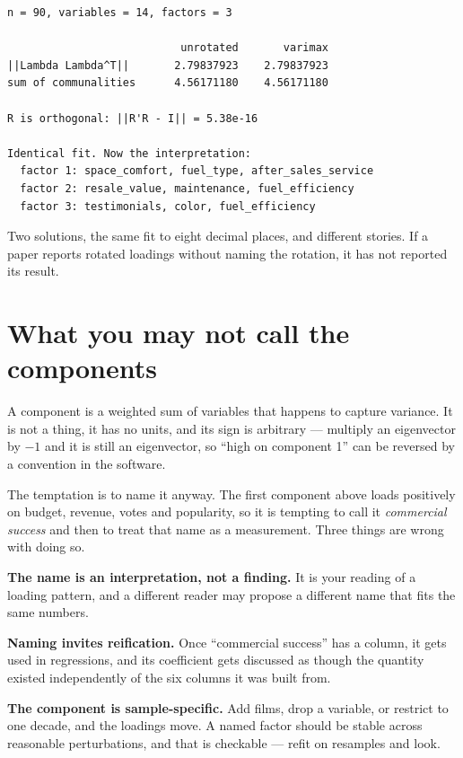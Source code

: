\documentclass[
  letterpaper,
  10pt,
  twoside,
  openright,
  numbers=noenddot,
  chapterprefix=true]{scrbook}
\begin{document}
\begin{verbatim}
n = 90, variables = 14, factors = 3

                           unrotated       varimax
||Lambda Lambda^T||       2.79837923    2.79837923
sum of communalities      4.56171180    4.56171180

R is orthogonal: ||R'R - I|| = 5.38e-16

Identical fit. Now the interpretation:
  factor 1: space_comfort, fuel_type, after_sales_service
  factor 2: resale_value, maintenance, fuel_efficiency
  factor 3: testimonials, color, fuel_efficiency
\end{verbatim}

Two solutions, the same fit to eight decimal places, and different
stories. If a paper reports rotated loadings without naming the
rotation, it has not reported its result.

\section{What you may not call the
components}\label{what-you-may-not-call-the-components}

A component is a weighted sum of variables that happens to capture
variance. It is not a thing, it has no units, and its sign is arbitrary
--- multiply an eigenvector by \(-1\) and it is still an eigenvector, so
``high on component 1'' can be reversed by a convention in the software.

The temptation is to name it anyway. The first component above loads
positively on budget, revenue, votes and popularity, so it is tempting
to call it \emph{commercial success} and then to treat that name as a
measurement. Three things are wrong with doing so.

\textbf{The name is an interpretation, not a finding.} It is your
reading of a loading pattern, and a different reader may propose a
different name that fits the same numbers.

\textbf{Naming invites reification.} Once ``commercial success'' has a
column, it gets used in regressions, and its coefficient gets discussed
as though the quantity existed independently of the six columns it was
built from.

\textbf{The component is sample-specific.} Add films, drop a variable,
or restrict to one decade, and the loadings move. A named factor should
be stable across reasonable perturbations, and that is checkable ---
refit on resamples and look.
\end{document}
